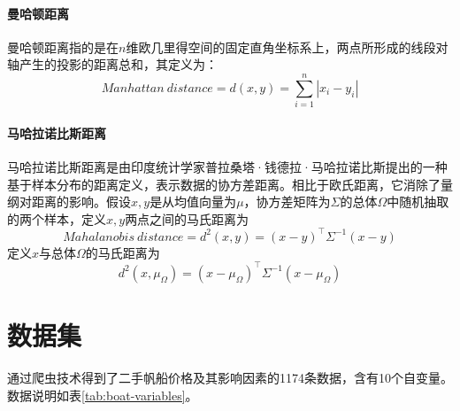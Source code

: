 \documentclass[a4paper,12pt,onecolumn,oneside]{article}
\begin{document}
	\paragraph{曼哈顿距离} 曼哈顿距离指的是在$n$维欧几里得空间的固定直角坐标系上，两点所形成的线段对轴产生的投影的距离总和，其定义为：
	\begin{equation*}
		Manhattan~distance = d(x,y) = \sum_{i=1}^{n}|x_i-y_i|
	\end{equation*}
	\paragraph{马哈拉诺比斯距离} 马哈拉诺比斯距离是由印度统计学家普拉桑塔·钱德拉·马哈拉诺比斯提出的一种基于样本分布的距离定义，表示数据的协方差距离。相比于欧氏距离，它消除了量纲对距离的影响。假设$x, y$是从均值向量为$\mu$，协方差矩阵为$\Sigma$的总体$\Omega$中随机抽取的两个样本，定义$x, y$两点之间的马氏距离为
	\begin{equation*}
		Mahalanobis~distance = d^{2}(x,y) = (x-y)^{\top}\Sigma^{-1}(x-y)
	\end{equation*}
	定义$x$与总体$\Omega$的马氏距离为
	\begin{equation*}
		d^{2}(x,\mu_{\Omega}) = (x-\mu_{\Omega})^{\top}\Sigma^{-1}(x-\mu_{\Omega})
	\end{equation*}
	
	\section{数据集}  %
	通过爬虫技术得到了二手帆船价格及其影响因素的1174条数据，含有10个自变量。数据说明如表\ref{tab:boat-variables}。\par 
	
\end{document}
